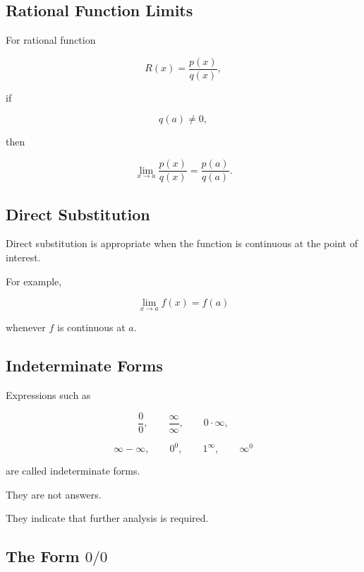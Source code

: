 \subsection{Rational Function Limits}
\label{subsec:rational-function-limit-reference}

For rational function

\[
R(x)
=
\frac{p(x)}{q(x)},
\]

if

\[
q(a)\neq0,
\]

then

\[
\boxed{
\lim_{x\to a}
\frac{p(x)}{q(x)}
=
\frac{p(a)}{q(a)}.
}
\]

\subsection{Direct Substitution}
\label{subsec:direct-substitution-limit}

Direct substitution is appropriate when the function is continuous at the
point of interest.

For example,

\[
\boxed{
\lim_{x\to a}f(x)
=
f(a)
}
\]

whenever \(f\) is continuous at \(a\).

\subsection{Indeterminate Forms}
\label{subsec:indeterminate-forms-reference}

Expressions such as

\[
\boxed{
\frac00,
\qquad
\frac{\infty}{\infty},
\qquad
0\cdot\infty,
}
\]

\[
\boxed{
\infty-\infty,
\qquad
0^0,
\qquad
1^\infty,
\qquad
\infty^0
}
\]

are called indeterminate forms.

They are not answers.

They indicate that further analysis is required.

\subsection{The Form \(0/0\)}
\label{subsec:zero-over-zero}

